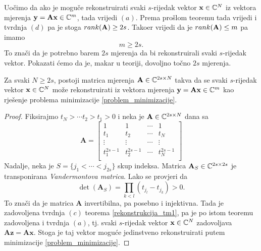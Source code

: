 \documentclass[a4paper,twoside,12pt]{memoir} %
\newcommand{\vect}[1]{\mathbf{#1}}
\renewcommand{\vec}{\vect}
\newcommand{\rank}{\text\normalfont{rank}}
\begin{document}
Uo\v{c}imo da ako je mogu\v{c}e rekonstruirati svaki $s$-rijedak vektor $\vec x \in \C^N$ iz vektora mjerenja $\vec y = \vec{Ax} \in \C^m$, tada vrijedi $(a)$. Prema pro\v{s}lom teoremu tada vrijedi i tvrdnja $(d)$ pa je stoga $\rank(\vec A) \geq 2s$. Tako\dj er vrijedi da je $\rank(\vec A) \leq m$ pa imamo 
\begin{equation*}
    m \geq 2s.    
\end{equation*}
To zna\v{c}i da je potrebno barem $2s$ mjerenja da bi rekonstruirali svaki $s$-rijedak vektor. Pokazati \'cemo da je, makar u teoriji, dovoljno to\v{c}no $2s$ mjerenja.

\begin{thm}
    Za svaki $N \geq 2s$, postoji matrica mjerenja $\vec A \in \C^{2s \times N}$ takva da se svaki $s$-rijedak vektor $\vec x \in \C^N$ mo\v{z}e rekonstruirati iz vektora mjerenja $\vec y = \vec{Ax} \in \C^m$ kao rje\v{s}enje problema minimizacije \eqref{problem_minimizacije}.
\end{thm}
\begin{proof}
    Fiksirajmo $t_N>\cdots t_2 > t_1 > 0$ i neka je $\vec A \in \C^{2s \times N}$ dana sa
    \begin{equation}\label{vandermont_matrica}
        \vec A = 
        \begin{bmatrix}
            1 & 1 & \cdots & 1 \\ 
            t_1 & t_2 & \cdots & t_N \\
            \vdots & \vdots & \cdots & \vdots \\
            t_1^{2s-1} & t_2^{2s-1} & \cdots & t_N^{2s-1} \\
        \end{bmatrix}
    \end{equation}
    Nadalje, neka je $S=\{j_1 < \cdots < j_{2s}\}$ skup indeksa. Matrica $\vec A_S \in \C^{2s \times 2s}$ je transponirana \textit{Vandermontova matrica}. Lako se provjeri da
    \begin{equation*}
        \det(\vec{A}_S) = \prod_{k < l} (t_{j_l} - t_{j_k})>0.
    \end{equation*}
    To zna\v{c}i da je matrica $\vec A$ invertibilna, pa posebno i injektivna. Tada je zadovoljena tvrdnja $(c)$ teorema \eqref{rekonstrukcija_tm1}, pa je po istom teoremu zadovoljena i tvrdnja $(a)$, tj. svaki $s$-rijedak vektor $\vec x \in \C^N$ zadovoljava $\vec{Az}=\vec{Ax}$. Stoga je taj vektor mogu\'ce jedinstveno rekonstruirati putem minimizacije \eqref{problem_minimizacije}.
\end{proof}
\end{document}
